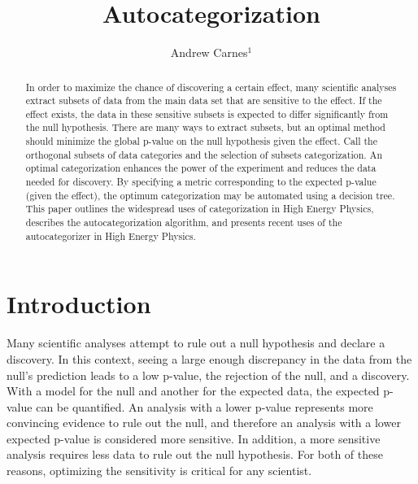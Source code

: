 \documentclass[review]{elsarticle}
\begin{document}
\begin{frontmatter}

\title{Autocategorization}

\author{Andrew Carnes$^{1}$}
\address{$^1$University of Florida}

\begin{abstract}
In order to maximize the chance of discovering a certain effect, many scientific analyses extract subsets of data from the main data set that are sensitive to the effect. If the effect exists, the data in these sensitive subsets is expected to differ significantly from the null hypothesis. There are many ways to extract subsets, but an optimal method should minimize the global p-value on the null hypothesis given the effect. Call the orthogonal subsets of data categories and the selection of subsets categorization. An optimal categorization enhances the power of the experiment and reduces the data needed for discovery. By specifying a metric corresponding to the expected p-value (given the effect), the optimum categorization may be automated using a decision tree. This paper outlines the widespread uses of categorization in High Energy Physics, describes the autocategorization algorithm, and presents recent uses of the autocategorizer in High Energy Physics. 
\end{abstract}


\end{frontmatter}

\linenumbers

\section{Introduction}

Many scientific analyses attempt to rule out a null hypothesis and declare a discovery. In this context, seeing a large enough discrepancy in the data from the null's prediction leads to a low p-value, the rejection of the null, and a discovery. With a model for the null and another for the expected data, the expected p-value can be quantified. An analysis with a lower p-value represents more convincing evidence to rule out the null, and therefore an analysis with a lower expected p-value is considered more sensitive. In addition, a more sensitive analysis requires less data to rule out the null hypothesis. For both of these reasons, optimizing the sensitivity is critical for any scientist.
\end{document}
